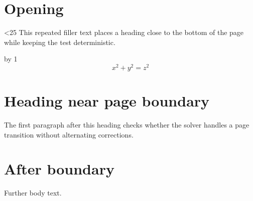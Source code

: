 \documentclass{article}
\begin{document}
\section{Opening}
\newcount\n {}
\loop\ifnum\n<25
This repeated filler text places a heading close to the bottom of the page while keeping the test deterministic.\par
\advance\n by 1
\repeat
\begin{equation} x^2+y^2=z^2 \end{equation}
\section{Heading near page boundary}
The first paragraph after this heading checks whether the solver handles a page transition without alternating corrections.
\section{After boundary}
Further body text.
\end{document}
